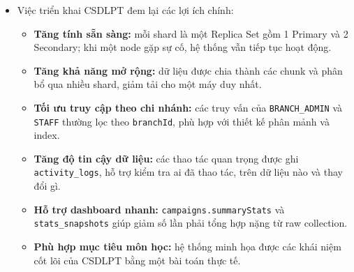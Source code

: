 \documentclass[12pt,a4paper]{article}
\begin{document}
\begin{itemize}
\item Việc triển khai CSDLPT đem lại các lợi ích chính:
\begin{itemize}
\item \textbf{Tăng tính sẵn sàng:} mỗi shard là một Replica Set gồm 1 Primary và 2 Secondary; khi một node gặp sự cố, hệ thống vẫn tiếp tục hoạt động.
\item \textbf{Tăng khả năng mở rộng:} dữ liệu được chia thành các chunk và phân bổ qua nhiều shard, giảm tải cho một máy duy nhất.
\item \textbf{Tối ưu truy cập theo chi nhánh:} các truy vấn của \texttt{BRANCH\_ADMIN} và \texttt{STAFF} thường lọc theo \texttt{branchId}, phù hợp với thiết kế phân mảnh và index.
\item \textbf{Tăng độ tin cậy dữ liệu:} các thao tác quan trọng được ghi \texttt{activity\_logs}, hỗ trợ kiểm tra ai đã thao tác, trên dữ liệu nào và thay đổi gì.
\item \textbf{Hỗ trợ dashboard nhanh:} \texttt{campaigns.summaryStats} và \texttt{stats\_snapshots} giúp giảm số lần phải tổng hợp nặng từ raw collection.
\item \textbf{Phù hợp mục tiêu môn học:} hệ thống minh họa được các khái niệm cốt lõi của CSDLPT bằng một bài toán thực tế.
\end{itemize}
\end{itemize}
\end{document}
